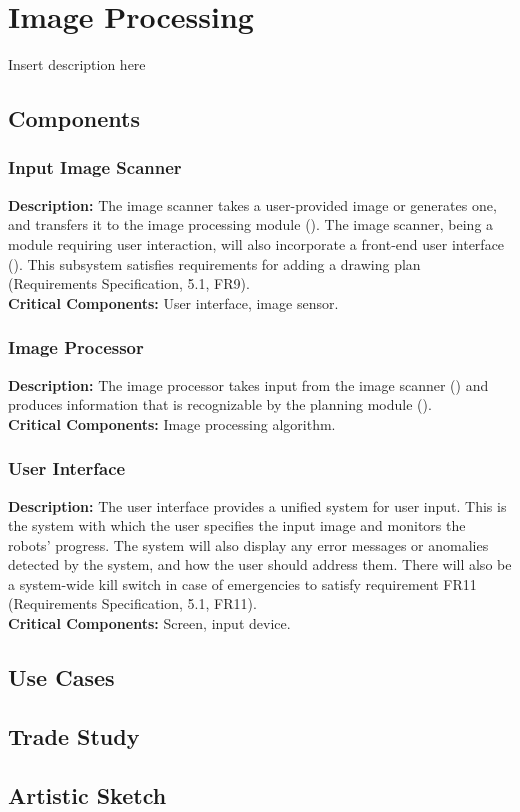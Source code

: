 
\section{Image Processing}
\label{sec:image_processing}
Insert description here

\subsection{Components}

\subsubsection{Input Image Scanner}
\label{sec:subsystem_input_scanner}
\textbf{Description:} The image scanner takes a user-provided image or generates one, and transfers it to the image processing module (). The image scanner, being a module requiring user interaction, will also incorporate a front-end user interface (). This subsystem satisfies requirements for adding a drawing plan (Requirements Specification, 5.1, FR9). \\
\textbf{Critical Components:} User interface, image sensor. \\

\subsubsection{Image Processor}
\label{sec:subsystem_image_processor}
\textbf{Description:} The image processor takes input from the image scanner () and produces information that is recognizable by the planning module (). \\
\textbf{Critical Components:} Image processing algorithm. \\

\subsubsection{User Interface}
\label{sec:subsystem_ui}
\textbf{Description:} The user interface provides a unified system for user input. This is the system with which the user specifies the input image and monitors the robots' progress. The system will also display any error messages or anomalies detected by the system, and how the user should address them. There will also be a system-wide kill switch in case of emergencies to satisfy requirement FR11 (Requirements Specification, 5.1, FR11). \\
\textbf{Critical Components:} Screen, input device. \\

\subsection{Use Cases}

\subsection{Trade Study}

\subsection{Artistic Sketch}